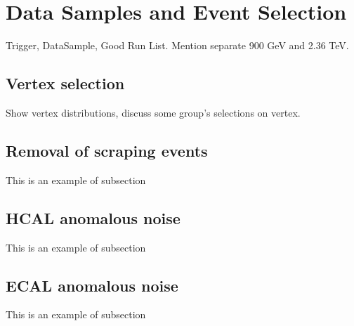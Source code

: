 \section{Data Samples and Event Selection}

Trigger, DataSample, Good Run List. Mention separate 900 GeV and 2.36
TeV. 

\subsection{Vertex selection}
Show vertex distributions, discuss some group's selections on vertex.

\subsection{Removal of scraping events}
This is an example of subsection

\subsection{HCAL anomalous noise}

This is an example of subsection

\subsection{ECAL anomalous noise}

This is an example of subsection

